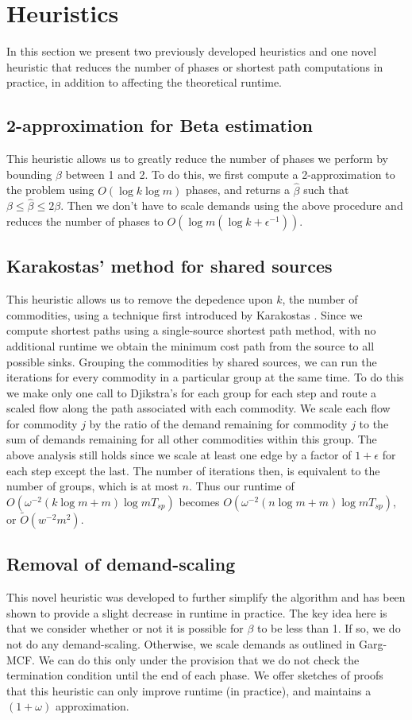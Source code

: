 \section{Heuristics}
In this section we present two  previously developed heuristics and
one novel heuristic that reduces the number of phases or shortest
path computations in practice, in addition to affecting the
theoretical runtime.
\subsection{2-approximation for Beta estimation}
This heuristic allows us to greatly reduce the number of phases we
perform by bounding $\beta$ between 1 and 2. To do this, we first
compute a 2-approximation to the problem using $O(\log k \log m)$
phases, and returns a $\hat{\beta}$ such that $\beta\leq \hat{\beta}\leq2\beta$. Then we don't have to scale demands using the above procedure
and reduces the number of phases to $O(\log m(\log
k+\epsilon^{-1}))$.%

\subsection{Karakostas' method for shared sources}
This heuristic allows us to remove the depedence upon $k$, the number
of commodities, using a technique first introduced by Karakostas \cite{karakostas}. 
Since
we compute shortest paths using a single-source shortest path method,
with no additional runtime we obtain the minimum cost path from the
source to all possible sinks. Grouping the commodities by shared
sources, we can run the iterations for every commodity in a particular
group at the same time. To do this we make only one call to Djikstra's
for each group for each step and route a scaled flow along the path
associated with each commodity. We scale each flow for commodity $j$
by the ratio of the demand remaining for commodity $j$ to the sum of
demands remaining for all other commodities within this group. The
above analysis still holds since we scale at least one edge by a
factor of $1+\epsilon$ for each step except the last. The number of
iterations then, is equivalent to the number of groups, which is at most
$n$. Thus our runtime of $O(\omega^{-2}(k\log m+m)\log m T_{sp})$
becomes $O(\omega^{-2}(n\log m+m)\log m T_{sp})$, or $\tilde{O}(w^{-2}m^2)$.
\subsection{Removal of demand-scaling}
This novel heuristic was developed to further simplify the algorithm
and has been shown to provide a slight decrease in runtime in
practice. The key idea here is that we consider whether or not it is
possible for $\beta$ to be less than 1. If so, we do not do any
demand-scaling. Otherwise, we scale demands as outlined in Garg-MCF. We can do this only under
the provision that we do not check the termination condition until the
end of each phase. We offer sketches of proofs that this heuristic can
only improve runtime (in practice), and maintains a $(1+\omega)$
approximation. 


